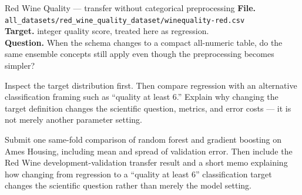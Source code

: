 \begin{kaggleproject}{Red Wine Quality --- transfer without categorical preprocessing}
\textbf{File.} \texttt{all\_datasets/red\_wine\_quality\_dataset/winequality-red.csv}\\
\textbf{Target.} integer quality score, treated here as regression.\\
\textbf{Question.} When the schema changes to a compact all-numeric table, do the same ensemble concepts still apply even though the preprocessing becomes simpler?



\begin{tryit}
Inspect the target distribution first. Then compare regression with an alternative classification framing such as ``quality at least 6.'' Explain why changing the target definition changes the scientific question, metrics, and error costs --- it is not merely another parameter setting.
\end{tryit}
\end{kaggleproject}

\begin{labdeliverable}
Submit one same-fold comparison of random forest and gradient boosting on Ames Housing, including mean and spread of validation error. Then include the Red Wine development-validation transfer result and a short memo explaining how changing from regression to a ``quality at least 6'' classification target changes the scientific question rather than merely the model setting.
\end{labdeliverable}

